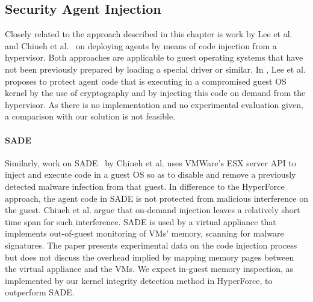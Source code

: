 
 
\subsection{Security Agent Injection} \label{secagent}
Closely related to the approach described in this chapter is
work by Lee et al.~\cite{lee:agent-injection} and Chiueh et al.~\cite{chiueh:sade} 
on deploying agents by means of code injection from a hypervisor. Both approaches 
are applicable to guest operating systems that have not been previously prepared by loading a 
special driver or similar.
%
In \cite{lee:agent-injection}, Lee et al. proposes to protect agent code that is 
executing in a compromised guest OS kernel by the use of cryptography and by injecting 
this code on demand from the hypervisor. As there is no implementation and no 
experimental evaluation given, a comparison with our solution is not feasible.
%
\paragraph{SADE}
Similarly, work on SADE~\cite{chiueh:sade} by Chiueh et al. uses VMWare's ESX server 
API to inject and execute code in a guest OS so as to disable and remove a previously 
detected malware infection from that guest. In difference to the HyperForce approach, 
the agent code in SADE is not protected from malicious interference on the guest. 
Chiueh et al. argue that on-demand injection leaves a relatively short time span for 
such interference. SADE is used by a virtual appliance that implements out-of-guest 
monitoring of VMs' memory, scanning for malware signatures.
The paper presents experimental data on the code injection process but does not discuss 
the overhead implied by mapping memory pages between the virtual appliance and the VMs. 
We expect in-guest memory inspection, as implemented by our kernel integrity detection 
method in HyperForce, to outperform SADE.



